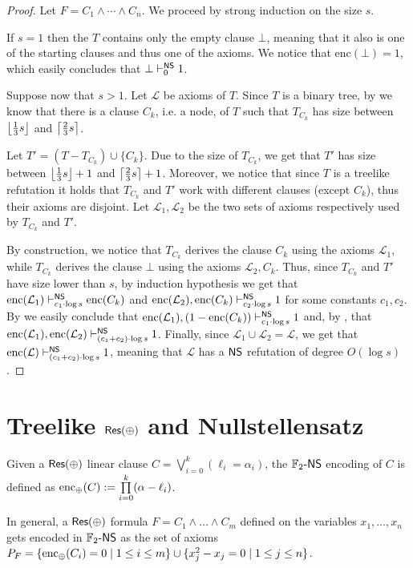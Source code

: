 \begin{proof}
    Let $F = C_1 \land \cdots \land C_n$. We proceed by strong induction on the size $s$.
    
    If $s = 1$ then the $T$ contains only the empty clause $\bot$, meaning that it also is one of the starting clauses and thus one of the axioms. We notice that $\mathrm{enc}(\bot) = 1$, which easily concludes that $\bot \vdash_{0}^{\mathsf{NS}} 1$.

    Suppose now that $s > 1$. Let $\mathcal{L}$ be axioms of $T$. Since $T$ is a binary tree, by  we know that there is a clause $C_k$, i.e. a node, of $T$ such that $T_{C_k}$ has size between $\left \lfloor \frac{1}{3} s \right \rfloor$ and $\left \lceil \frac{2}{3} s \right \rceil$.

    Let $T' = (T - T_{C_k}) \cup \{C_k\}$. Due to the size of $T_{C_k}$, we get that $T'$ has size between $\left \lfloor \frac{1}{3} s \right \rfloor+1$ and $\left \lceil \frac{2}{3} s \right \rceil+1$. Moreover, we notice that since $T$ is a treelike refutation it holds that $T_{C_k}$ and $T'$ work with different clauses (except $C_k$), thus their axioms are disjoint. Let $\mathcal{L}_1, \mathcal{L}_2$ be the two sets of axioms respectively used by $T_{C_k}$ and $T'$.
    
    By construction, we notice that $T_{C_k}$ derives the clause $C_k$ using the axioms $\mathcal{L}_1$, while $T_{C_k}$ derives the clause $\bot$ using the axioms $\mathcal{L}_2, C_k$. Thus, since $T_{C_k}$ and $T'$ have size lower than $s$, by induction hypothesis we get that $\mathrm{enc}(\mathcal{L}_1) \vdash_{c_1 \cdot \log s}^{\mathsf{NS}} \mathrm{enc}(C_k)$ and $\mathrm{enc}(\mathcal{L}_2), \mathrm{enc}(C_k) \vdash_{c_2 \cdot \log s}^{\mathsf{NS}} 1$ for some constants $c_1, c_2$. By  we easily conclude that $\mathrm{enc}(\mathcal{L}_1), (1- \mathrm{enc}(C_k)) \vdash_{c_1 \cdot \log s}^{\mathsf{NS}} 1$ and, by , that $\mathrm{enc}(\mathcal{L}_1), \mathrm{enc}(\mathcal{L}_2) \vdash_{(c_1+c_2) \cdot \log s}^{\mathsf{NS}} 1$. Finally, since $\mathcal{L}_1 \cup \mathcal{L}_2 = \mathcal{L}$, we get that $\mathrm{enc}(\mathcal{L}) \vdash_{(c_1+c_2) \cdot \log s}^{\mathsf{NS}} 1$, meaning that $\mathcal{L}$ has a $\mathsf{NS}$ refutation of degree $O(\log s)$.

\end{proof}

\section{Treelike $\mathsf{Res(\oplus)}$ and Nullstellensatz}

\begin{definition}
    Given a $\mathsf{Res(\oplus)}$ linear clause $C = \bigvee\limits_{i = 0}^k (\ell_i = \alpha_i)$, the $\mathbb{F}_2\text{-}\mathsf{NS}$ encoding of $C$ is defined as $\mathrm{enc}_{\oplus}(C) := \prod\limits_{i = 0}^k (\alpha - \ell_i)$.
    
    In general, a $\mathsf{Res(\oplus)}$ formula $F = C_1 \land \ldots \land C_m$ defined on the variables $x_1, \ldots, x_n$ gets encoded in $\mathbb{F}_2\text{-}\mathsf{NS}$ as the set of axioms $P_F = \{\mathrm{enc}_{\oplus}(C_i) = 0 \mid 1 \leq i \leq m\} \cup \{x_j^2-x_j = 0 \mid 1 \leq j \leq n\}$.
\end{definition}

